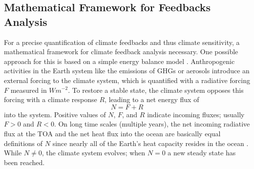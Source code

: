 \subsection{Mathematical Framework for Feedbacks Analysis}
\label{subsec:02:mathematical_framework_feedbacks}

For a precise quantification of climate feedbacks and thus climate sensitivity,
a mathematical framework for climate feedback analysis necessary. One possible
approach for this is based on a simple energy balance model
\autocite{Gregory2009, Roe2009}. Anthropogenic activities in the Earth system
like the emissions of \acp{GHG} or aerosols introduce an external forcing to
the climate system, which is quantified with a radiative forcing $F$ measured
in $\si{W m^{-2}}$. To restore a stable state, the climate system opposes this
forcing with a climate response $R$, leading to a net energy flux of
\begin{equation}
  N = F + R
  \label{eq:02:N}
\end{equation}
into the system. Positive values of $N$, $F$, and $R$ indicate incoming fluxes;
usually $F > 0$ and $R < 0$. On long time scales (multiple years), the net
incoming radiative flux at the \ac{TOA} and the net heat flux into the ocean
are basically equal definitions of $N$ since nearly all of the Earth's heat
capacity resides in the ocean \autocite{Gregory2009}. While $N \neq 0$, the
climate system evolves; when $N = 0$ a new steady state has been reached.

